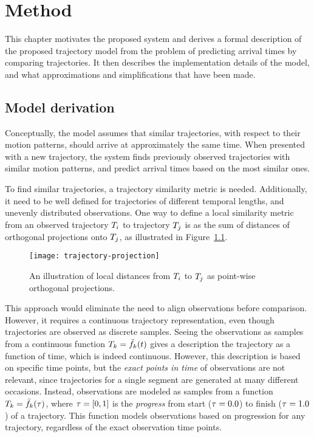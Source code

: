 \chapter{Method}\label{cha:method}
This chapter motivates the proposed system and derives a formal
description of the proposed trajectory model from the problem of
predicting arrival times by comparing trajectories. 
It then describes the implementation details of the model, and what
approximations and simplifications that have been made.

\section{Model derivation}
Conceptually, the model assumes that similar trajectories, with
respect to their motion patterns, should arrive at 
approximately the same time. When presented with a new trajectory, the system
finds previously observed trajectories with similar motion patterns,
and predict arrival times based on the most similar ones. 

To find similar trajectories, a trajectory similarity metric 
is needed. Additionally, it need to be well defined for
trajectories of different temporal lengths, and unevenly
distributed observations. One way to define a local similarity metric from
an observed trajectory $T_{i}$ to trajectory $T_{j}$ 
is as the sum of distances of orthogonal
projections onto $T_{j}$, as illustrated in Figure~\ref{fig:trajectory-projection}.
\begin{figure}
  \centering
  \texttt{[image: trajectory-projection]}
  \caption{An illustration of local distances from $T_i$ to
  $T_j$ as point-wise orthogonal projections.}\label{fig:trajectory-projection}
\end{figure}
This approach would eliminate the need to align observations before
comparison. However, it requires a continuous trajectory
representation, even though trajectories are observed as discrete samples.
Seeing the observations as samples from a continuous function
$T_{k} = \tilde{f}_{k}(t)$ gives a description the trajectory as a function of
time, which is indeed continuous. However, this description is based on specific time
points, but the \textit{exact points in time} of observations are not
relevant, since trajectories for a single segment are generated at many different
occasions. Instead, observations are modeled as samples from a function
$T_{k} = \bar{f}_{k}(\tau)$, where $\tau = [0, 1]$ 
is the \textit{progress} from start ($\tau = 0.0$) to finish ($\tau = 1.0$) 
of a trajectory. This function models observations based on
progression for any trajectory, regardless of the exact observation
time points.

